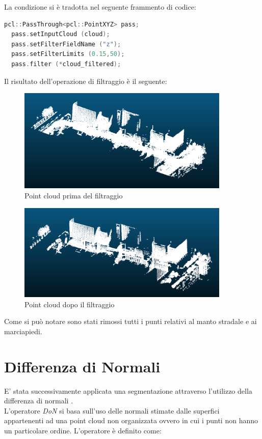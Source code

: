La condizione si è tradotta nel seguente frammento di codice:
\begin{lstlisting}[caption={Filtraggio della pointcloud},captionpos=b,language=cpp]
  pcl::PassThrough<pcl::PointXYZ> pass;
  pass.setInputCloud (cloud);
  pass.setFilterFieldName ("z");
  pass.setFilterLimits (0.15,50);
  pass.filter (*cloud_filtered);
\end{lstlisting}

Il risultato dell'operazione di filtraggio è il seguente:

\begin{figure}[H]
\centering
       \includegraphics[width=0.9\textwidth]{Immagini/PC.png}
       \caption{Point cloud prima del filtraggio}
       \label{fig:PC} 
\end{figure}
\begin{figure}[H]
\centering
       \includegraphics[width=0.9\textwidth]{Immagini/PCFiltered.png}
       \caption{Point cloud  dopo il filtraggio}
       \label{fig:PCfiltered}
\end{figure}
Come si può notare sono stati rimossi tutti i punti relativi al manto stradale e ai marciapiedi.

\section{Differenza di Normali}
E' stata successivamente applicata una segmentazione attraverso l'utilizzo della differenza di normali \cite{don}.
\\L'operatore \textit{DoN} si basa sull'uso delle normali stimate dalle superfici appartenenti ad una point cloud non organizzata ovvero in cui i punti non hanno un particolare ordine.
L'operatore è definito come:

